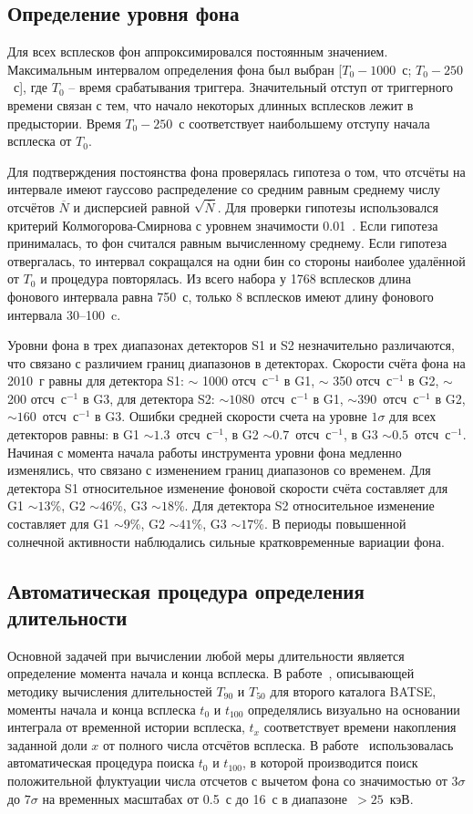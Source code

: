 \subsection{Определение уровня фона}
Для всех всплесков фон аппроксимировался постоянным значением. Максимальным интервалом определения фона был выбран [$T_0 - 1000$~с; $T_0 - 250$~с], где $T_0$ -- время срабатывания триггера. Значительный отступ от триггерного времени связан с тем, что начало некоторых длинных всплесков лежит в предыстории. Время $T_0-250$~с соответствует наибольшему отступу начала всплеска от $T_0$.

Для подтверждения постоянства фона проверялась гипотеза о том, что отсчёты на интервале имеют гауссово распределение со средним равным среднему числу отсчётов $\overline{N}$ и дисперсией равной $\sqrt{\overline{N}}$. Для проверки гипотезы использовался критерий Колмогорова-Смирнова с уровнем значимости 0.01~\citep{Press1992NRC}. Если гипотеза принималась, то фон считался равным вычисленному среднему. Если гипотеза отвергалась, то интервал сокращался на одни бин со стороны наиболее удалённой от $T_0$ и процедура повторялась. Из всего набора у 1768 всплесков длина фонового интервала равна 750~с, только 8 всплесков имеют длину фонового интервала 30--100~c.

Уровни фона в трех диапазонах детекторов S1 и S2 незначительно различаются, что связано с различием границ диапазонов в детекторах. Скорости счёта фона на 2010~г равны для детектора S1: $\sim$ 1000 отсч~с$^{-1}$ в G1, $\sim$ 350 отсч~с$^{-1}$ в G2, $\sim$ 200 отсч~с$^{-1}$ в G3, для детектора S2: $\sim 1080$~отсч~с$^{-1}$ в G1, $\sim 390$~отсч~с$^{-1}$ в G2, $\sim160$~отсч~с$^{-1}$ в G3. Ошибки средней скорости счета на уровне $1\sigma$ для всех детекторов равны: в G1 $\sim 1.3$~отсч~с$^{-1}$, в G2 $\sim 0.7$~отсч~с$^{-1}$, в G3 $\sim 0.5$~отсч~с$^{-1}$. Начиная с момента начала работы инструмента уровни фона медленно изменялись, что связано с изменением границ диапазонов со временем. Для детектора S1 относительное изменение фоновой скорости счёта составляет для G1 $\sim 13$\%, G2 $\sim 46$\%, G3 $\sim 18$\%. Для детектора S2 относительное изменение составляет для G1 $\sim 9$\%, G2 $\sim 41$\%, G3 $\sim 17$\%. В периоды повышенной солнечной активности наблюдались сильные кратковременные вариации фона. 

\subsection{Автоматическая процедура определения длительности}
Основной задачей при вычислении любой меры длительности является определение момента начала и конца всплеска. В работе~\citep{Koshut_1996}, описывающей методику вычисления длительностей $T_{90}$ и $T_{50}$  для второго каталога BATSE, моменты начала и конца всплеска $t_{0}$ и $t_{100}$ определялись визуально на основании интеграла от временной истории всплеска, $t_{x}$ соответствует времени накопления заданной доли $x$ от полного числа отсчётов всплеска. В работе~\citep{Bonnell_1997} использовалась автоматическая процедура поиска $t_{0}$ и $t_{100}$, в которой производится поиск положительной флуктуации числа отсчетов с вычетом фона со значимостью от $3\sigma$ до $7\sigma$ на временных масштабах от 0.5~с до 16~с в диапазоне~$>25$~кэВ. 

